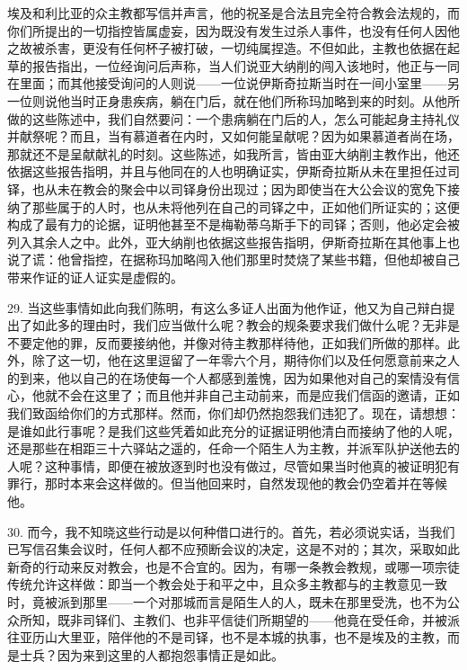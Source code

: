 埃及和利比亚的众主教都写信并声言，他的祝圣是合法且完全符合教会法规的，而你们所提出的一切指控皆属虚妄，因为既没有发生过杀人事件，也没有任何人因他之故被杀害，更没有任何杯子被打破，一切纯属捏造。不但如此，主教也依据在起草的报告指出，一位经询问后声称，当人们说亚大纳削的闯入该地时，他正与一同在里面；而其他接受询问的人则说——一位说伊斯奇拉斯当时在一间小室里——另一位则说他当时正身患疾病，躺在门后，就在他们所称玛加略到来的时刻。从他所做的这些陈述中，我们自然要问：一个患病躺在门后的人，怎么可能起身主持礼仪并献祭呢？而且，当有慕道者在内时，又如何能呈献呢？因为如果慕道者尚在场，那就还不是呈献献礼的时刻。这些陈述，如我所言，皆由亚大纳削主教作出，他还依据这些报告指明，并且与他同在的人也明确证实，伊斯奇拉斯从未在里担任过司铎，也从未在教会的聚会中以司铎身份出现过；因为即使当在大公会议的宽免下接纳了那些属于的人时，也从未将他列在自己的司铎之中，正如他们所证实的；这便构成了最有力的论据，证明他甚至不是梅勒蒂乌斯手下的司铎；否则，他必定会被列入其余人之中。此外，亚大纳削也依据这些报告指明，伊斯奇拉斯在其他事上也说了谎：他曾指控，在据称玛加略闯入他们那里时焚烧了某些书籍，但他却被自己带来作证的证人证实是虚假的。\par

29. 当这些事情如此向我们陈明，有这么多证人出面为他作证，他又为自己辩白提出了如此多的理由时，我们应当做什么呢？教会的规条要求我们做什么呢？无非是不要定他的罪，反而要接纳他，并像对待主教那样待他，正如我们所做的那样。此外，除了这一切，他在这里逗留了一年零六个月，期待你们以及任何愿意前来之人的到来，他以自己的在场使每一个人都感到羞愧，因为如果他对自己的案情没有信心，他就不会在这里了；而且他并非自己主动前来，而是应我们信函的邀请，正如我们致函给你们的方式那样。然而，你们却仍然抱怨我们违犯了。现在，请想想：是谁如此行事呢？是我们这些凭着如此充分的证据证明他清白而接纳了他的人呢，还是那些在相距三十六驿站之遥的，任命一个陌生人为主教，并派军队护送他去的人呢？这种事情，即便在被放逐到时也没有做过，尽管如果当时他真的被证明犯有罪行，那时本来会这样做的。但当他回来时，自然发现他的教会仍空着并在等候他。\par

30. 而今，我不知晓这些行动是以何种借口进行的。首先，若必须说实话，当我们已写信召集会议时，任何人都不应预断会议的决定，这是不对的；其次，采取如此新奇的行动来反对教会，也是不合宜的。因为，有哪一条教会教规，或哪一项宗徒传统允许这样做：即当一个教会处于和平之中，且众多主教都与的主教意见一致时，竟被派到那里——一个对那城而言是陌生人的人，既未在那里受洗，也不为公众所知，既非司铎们、主教们、也非平信徒们所期望的——他竟在受任命，并被派往亚历山大里亚，陪伴他的不是司铎，也不是本城的执事，也不是埃及的主教，而是士兵？因为来到这里的人都抱怨事情正是如此。\par

